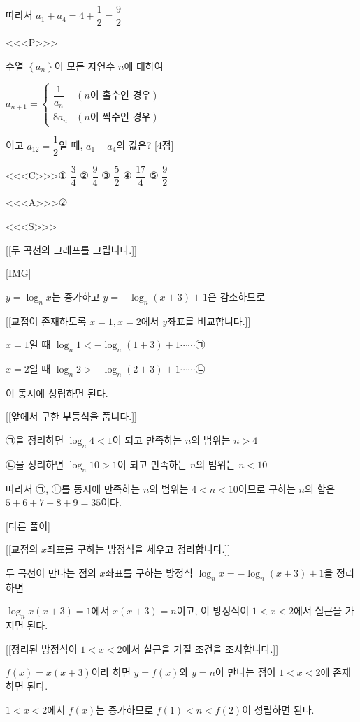 \documentclass{oblivoir}
\begin{document}
따라서 $a_{1}+a_{4}= 4+\dfrac{1}{2}=\dfrac{9}{2}$

<<<P>>>

수열 $\left\{a_{n}\right\}$이 모든 자연수 $n$에 대하여

$a_{n+1}=\begin{cases}
\dfrac{1}{a_{n}}&(n \text{이 홀수인 경우})\\
8a_{n}&(n \text{이 짝수인 경우})
\end{cases}$

이고 $a_{12}=\dfrac{1}{2}$일 때, $a_{1}+a_{4}$의 값은? [4점]

<<<C>>>① $\dfrac{3}{4}$ ② $\dfrac{9}{4}$ ③ $\dfrac{5}{2}$ ④ $\dfrac{17}{4}$ ⑤ $\dfrac{9}{2}$

<<<A>>>②

<<<S>>>

[[두 곡선의 그래프를 그립니다.]]

[IMG]

$y=\log_{n}x$는 증가하고 $y=-\log_{n}(x+3)+1$은 감소하므로

[[교점이 존재하도록 $x=1,x=2$에서 $y$좌표를 비교합니다.]]

$x=1$일 때 $\log_{n}1 < -\log_{n}(1+3)+1$$\cdots\cdots$㉠

$x=2$일 때 $\log_{n}2>-\log_{n}(2+3)+1$$\cdots\cdots$㉡

이 동시에 성립하면 된다.

[[앞에서 구한 부등식을 풉니다.]]

㉠을 정리하면 $\log_{n}4 < 1$이 되고 만족하는 $n$의 범위는 $n> 4$

㉡을 정리하면 $\log_{n}10 > 1$이 되고 만족하는 $n$의 범위는 $n< 10$

따라서 ㉠, ㉡를 동시에 만족하는 $n$의 범위는 $4< n < 10$이므로 구하는 $n$의 합은 $5+6+7+8+9=35$이다.

[다른 풀이]

[[교점의 $x$좌표를 구하는 방정식을 세우고 정리합니다.]]

두 곡선이 만나는 점의 $x$좌표를 구하는 방정식 $\log_{n}x=-\log_{n}(x+3)+1$을 정리하면

$\log_{n}x(x+3)=1$에서 $x(x+3)=n$이고, 이 방정식이 $1< x < 2$에서 실근을 가지면 된다.

[[정리된 방정식이 $1< x < 2$에서 실근을 가질 조건을 조사합니다.]]

$f(x)=x(x+3)$이라 하면 $y=f(x)$와 $y=n$이 만나는 점이 $1< x < 2$에 존재하면 된다.

$1< x < 2$에서 $f(x)$는 증가하므로 $f(1)< n < f(2)$이 성립하면 된다.
\end{document}
